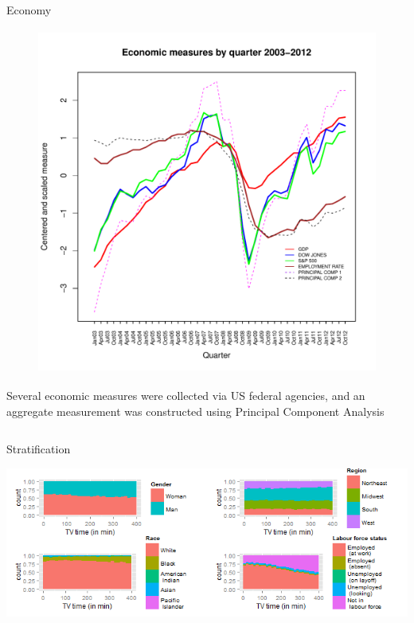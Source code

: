 \documentclass[final]{beamer}
\newcounter{acolumn}%
\def\autoheight{\vspace*{0pt}}%
\begin{document}
\begin{frame}
\begin{acolumns}[t]
\begin{column}{.24\linewidth}
\begin{block}{Economy}
                  \begin{figure}
                  \includegraphics[height=4.5in]{econ_measures.pdf}
                  \end{figure}
                  Several economic measures were collected via US federal agencies, and an aggregate measurement was constructed using Principal Component Analysis
                  
                  \vspace{2in}
                  \autoheight 
                \end{block}
        
              \end{column}
              
              \begin{column}{.24\linewidth}
               \begin{block}{Stratification}
                \begin{center}
                \includegraphics{stratification}
                \end{center}
               

\end{block}
\end{column}
\end{acolumns}
\end{frame}
\end{document}
